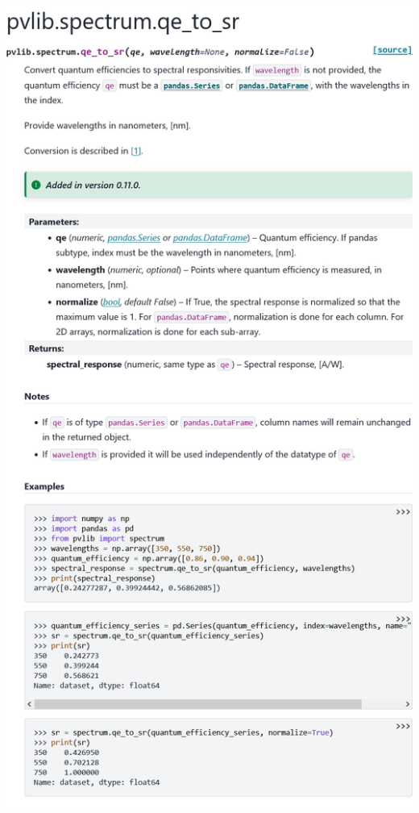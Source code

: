 \begin{myparindent}{0pt}
\includegraphics[width=\linewidth,height=0.9\textheight,keepaspectratio]{images/docs_funcs_cut/qe_to_sr_0.png}


\end{myparindent}
